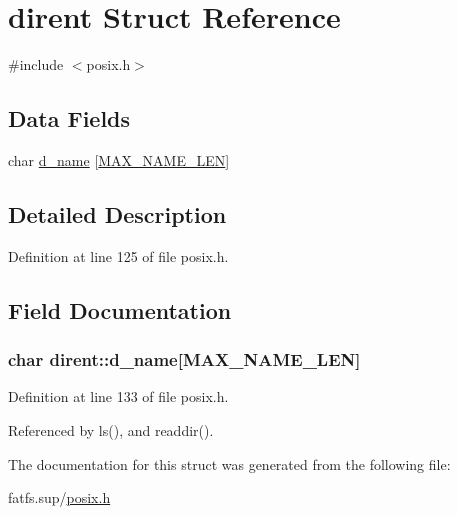 \hypertarget{structdirent}{}\section{dirent Struct Reference}
\label{structdirent}


{\ttfamily \#include $<$posix.\+h$>$}

\subsection*{Data Fields}
\begin{DoxyCompactItemize}
\item 
char \hyperlink{structdirent_ae61380f3ccbc6c32e8650d7bce76197b}{d\+\_\+name} \mbox{[}\hyperlink{posix_8h_afd709f201d7643c3909621f620ea648a}{M\+A\+X\+\_\+\+N\+A\+M\+E\+\_\+\+L\+EN}\mbox{]}
\end{DoxyCompactItemize}


\subsection{Detailed Description}


Definition at line 125 of file posix.\+h.



\subsection{Field Documentation}
\subsubsection[{\texorpdfstring{d\+\_\+name}{d_name}}]{\setlength{\rightskip}{0pt plus 5cm}char dirent\+::d\+\_\+name\mbox{[}{\bf M\+A\+X\+\_\+\+N\+A\+M\+E\+\_\+\+L\+EN}\mbox{]}}\hypertarget{structdirent_ae61380f3ccbc6c32e8650d7bce76197b}{}\label{structdirent_ae61380f3ccbc6c32e8650d7bce76197b}


Definition at line 133 of file posix.\+h.



Referenced by ls(), and readdir().



The documentation for this struct was generated from the following file\+:\begin{DoxyCompactItemize}
\item 
fatfs.\+sup/\hyperlink{posix_8h}{posix.\+h}\end{DoxyCompactItemize}
